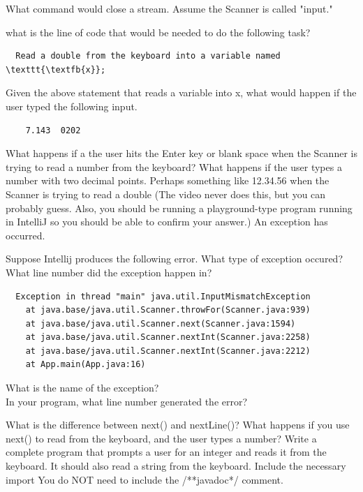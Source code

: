 \documentclass[letterpaper,11pt]{exam}
\begin{document}
\question What command would close a stream.  Assume the Scanner is called "input."
\begin{samepage}
\question what is the line of code that would be needed to do the following task?
\begin{verbatim}
  Read a double from the keyboard into a variable named \texttt{\textfb{x}};
\end{verbatim}
\end{samepage}
\begin{samepage}
\question Given the above statement that reads a variable into x, what would happen if the user typed the following input.  
\begin{verbatim}
    7.143  0202
\end{verbatim}
\end{samepage}
\question What happens if a the user hits the Enter key or blank space when the Scanner is trying to read a number from the keyboard?
\question What happens if the user types a number with two decimal points.  Perhaps something like 12.34.56 when the Scanner is trying to read a double (The video never does this, but you can probably guess.  Also, you should be running a playground-type program running in IntelliJ so you should be able to confirm your answer.)
\question An exception has occurred.  
\begin{samepage}
\question Suppose Intellij produces the following error.  What type of exception occured?  What line number did the exception happen in?
\begin{verbatim}
  Exception in thread "main" java.util.InputMismatchException
	at java.base/java.util.Scanner.throwFor(Scanner.java:939)
	at java.base/java.util.Scanner.next(Scanner.java:1594)
	at java.base/java.util.Scanner.nextInt(Scanner.java:2258)
	at java.base/java.util.Scanner.nextInt(Scanner.java:2212)
	at App.main(App.java:16)
\end{verbatim}
  What is the name of the exception?\\
  In your program, what line number generated the error?
\end{samepage}
\question What is the difference between next() and nextLine()?
\vspace{1cm}
\question What happens if you use next() to read from the keyboard, and the user types a number?
\question Write a complete program that prompts a user for an integer and reads it from the keyboard.  It should also read a string from the keyboard. Include the necessary import  You do NOT need to include the /**javadoc*/ comment.
\vspace{2in}
\end{document}
